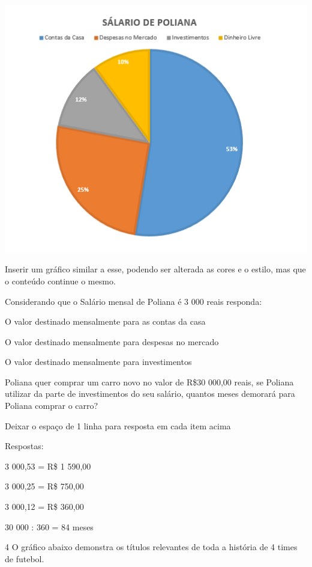 \includegraphics[width=3\times 65in,height=2\times 98179in]{./imgSAEB_8_MAT/media/image41.png}

Inserir um gráfico similar a esse, podendo ser alterada as cores e o
estilo, mas que o conteúdo continue o mesmo.

Considerando que o Salário mensal de Poliana é 3 000 reais responda:

\item O valor destinado mensalmente para as contas da casa
\item O valor destinado mensalmente para despesas no mercado
\item O valor destinado mensalmente para investimentos
\item Poliana quer comprar um carro novo no valor de R\$30 000,00 reais, se
Poliana utilizar da parte de investimentos do seu salário, quantos meses
demorará para Poliana comprar o carro?

Deixar o espaço de 1 linha para resposta em cada item acima

Respostas:

\item 3 000,53 = R\$ 1 590,00
\item 3 000,25 = R\$ 750,00
\item 3 000,12 = R\$ 360,00
\item 30 000 : 360 = 84 meses

\num{4} O gráfico abaixo demonstra os títulos relevantes de toda a história
de 4 times de futebol.

